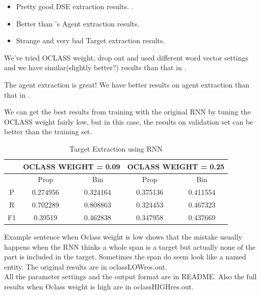 \documentclass[fontsize=11pt, %
                             paper=a4, %
                             twoside, %
                             captions=tableheading,
                             index=totoc,
                             hyperref]{labbook}
\begin{document}
\printindex

\begin{addmargin}[4cm]{0cm} %

\pagestyle{scrheadings} %



\begin{itemize}
	\item Pretty good DSE extraction results. \cite{ozanRNN}.
	\item Better than \cite{bishanJoint}'s Agent extraction results.
	\item Strange and very bad Target extraction results.
\end{itemize}



We've tried OCLASS weight, drop out and used different word vector settings and we have similar(slightly better?) results than that in \cite{ozanRNN}.


The agent extraction is great! We have better results on agent extraction than that in \cite{bishanJoint}.



We can get the best results from training with the original RNN by tuning the OCLASS weight fairly low, but in this case, the results on validation set can be better than the training set.\\
\begin{table}
\label{tab:original_results}
\raggedleft
\begin{tabular}{c|c|c|c|c|}
\toprule
&\multicolumn{2}{|c|}{OCLASS WEIGHT = 0.09} & \multicolumn{2}{|c|}{OCLASS WEIGHT = 0.25}\\
\hline
  & Prop     & Bin     & Prop     & Bin\\
\hline
P & 0.274956 &0.324164 & 0.375136 & 0.411554 \\
R & 0.702289 &0.808863 & 0.324453 & 0.467323\\
F1&  0.39519 &0.462838 & 0.347958 & 0.437669\\
\bottomrule
\end{tabular}
\caption{Target Extraction using RNN}
\end{table}
Example sentence when Oclass weight is low shows that the mistake usually happens when the RNN thinks a whole span is a target but actually none of the part is included in the target. Sometimes the span do seem look like a named entity. The original results are in oclassLOWres.out. \\ 
All the parameter settings and the output format are in README. Also the full results when Oclass weight is high are in oclassHIGHres.out. 


\end{addmargin}
\end{document}
